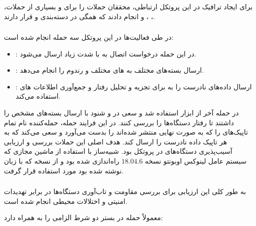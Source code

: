 \subsubsection{}

برای ایجاد ترافیک در این پروتکل ارتباطی، محققان حملات  را برای
 و بسیاری از حملات، ، ،  و
 انجام دادند که همگی در دسته‌بندی  و  قرار دارند.

\subsubsection{}

در طی فعالیت‌ها در این پروتکل سه حمله انجام شده است:

\begin{itemize}
    \item {}: در این حمله درخواست اتصال به  با
    شدت زیاد ارسال می‌شود.
    \item {}: ارسال بسته‌های مختلف به های مختلف و
    رندوم را انجام می‌دهد.
    \item {}: ارسال داده‌های نادرست را به
     برای تجزیه و تحلیل رفتار و جمع‌آوری اطلاعات های
    استفاده می‌کند.
\end{itemize}

در حمله آخر از ابزار  استفاده شد و سعی در  و شنود
 با ارسال بسته‌های مشخص را داشتند تا رفتار دستگاه‌ها را بررسی کنند.
در این فرایند حمله، حمله‌کننده نام تمام تاپیک‌های  را که به صورت نهایی
منتشر شده‌اند را بدست می‌آورد و سعی می‌کند که به هر تاپیک داده نادرست را ارسال
کند. هدف اصلی این حملات بررسی و ارزیابی آسیب‌پذیری دستگاه‌های  در
پروتکل  بود. شبیه‌ساز با استفاده از ماشین مجازی  که سیستم
عامل لینوکس اوبونتو نسخه $18.04.6$ راه‌اندازی شده بود و از نسخه 
 که با زبان  نوشته شده بود مورد استفاده قرار گرفت.

\subsubsection{}

به طور کلی این ارزیابی برای بررسی مقاومت و تاب‌آوری دستگاه‌ها در برابر تهدیدات
امنیتی و اختلالات محیطی انجام شده است.

معمولاً حمله در بستر  دو شرط الزامی را به همراه دارد:

